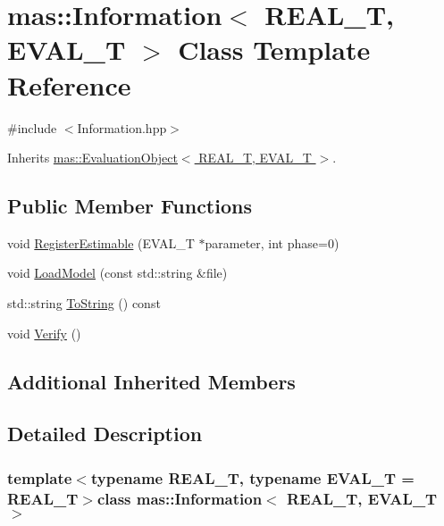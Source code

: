 \hypertarget{classmas_1_1_information}{}\section{mas\+:\+:Information$<$ R\+E\+A\+L\+\_\+\+T, E\+V\+A\+L\+\_\+\+T $>$ Class Template Reference}
\label{classmas_1_1_information}


{\ttfamily \#include $<$Information.\+hpp$>$}



Inherits \hyperlink{classmas_1_1_evaluation_object}{mas\+::\+Evaluation\+Object$<$ R\+E\+A\+L\+\_\+\+T, E\+V\+A\+L\+\_\+\+T $>$}.

\subsection*{Public Member Functions}
\begin{DoxyCompactItemize}
\item 
void \hyperlink{classmas_1_1_information_a94e2ca5cb7f84694c300a351243c3a3b}{Register\+Estimable} (E\+V\+A\+L\+\_\+\+T $\ast$parameter, int phase=0)
\item 
void \hyperlink{classmas_1_1_information_a4b8303a3b095a9185fd371a6db2f9412}{Load\+Model} (const std\+::string \&file)
\item 
std\+::string \hyperlink{classmas_1_1_information_a9dec6b9486d758b6c8c567f1c29ad59a}{To\+String} () const 
\item 
void \hyperlink{classmas_1_1_information_a2252a606545c7e79f1dd16507db3ab12}{Verify} ()
\end{DoxyCompactItemize}
\subsection*{Additional Inherited Members}


\subsection{Detailed Description}
\subsubsection*{template$<$typename R\+E\+A\+L\+\_\+\+T, typename E\+V\+A\+L\+\_\+\+T = R\+E\+A\+L\+\_\+\+T$>$class mas\+::\+Information$<$ R\+E\+A\+L\+\_\+\+T, E\+V\+A\+L\+\_\+\+T $>$}

